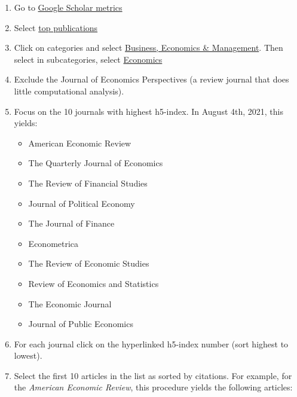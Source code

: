 \documentclass[
  openany]{book}
\providecommand{\tightlist}{%
  \setlength{\itemsep}{0pt}\setlength{\parskip}{0pt}}
\begin{document}
\begin{enumerate}
\def\labelenumi{\arabic{enumi}.}
\tightlist
\item
  Go to \href{https://scholar.google.com/citations?view_op=metrics_intro\&hl=en}{Google Scholar metrics}\\
\item
  Select \href{https://scholar.google.com/citations?view_op=top_venues\&hl=en}{top publications}\\
\item
  Click on categories and select \href{https://scholar.google.com/citations?view_op=top_venues\&hl=en\&vq=bus}{Business, Economics \& Management}. Then select in subcategories, select \href{https://scholar.google.com/citations?view_op=top_venues\&hl=en\&vq=bus_economics}{Economics}\\
\item
  Exclude the Journal of Economics Perspectives (a review journal that does little computational analysis).\\
\item
  Focus on the 10 journals with highest h5-index. In August 4th, 2021, this yields:

  \begin{itemize}
  \tightlist
  \item
    American Economic Review
  \item
    The Quarterly Journal of Economics
  \item
    The Review of Financial Studies
  \item
    Journal of Political Economy
  \item
    The Journal of Finance
  \item
    Econometrica
  \item
    The Review of Economic Studies
  \item
    Review of Economics and Statistics
  \item
    The Economic Journal
  \item
    Journal of Public Economics\\
  \end{itemize}
\item
  For each journal click on the hyperlinked h5-index number (sort highest to lowest).
\item
  Select the first 10 articles in the list as sorted by citations. For example, for the \emph{American Economic Review}, this procedure yields the following articles:


\end{enumerate}
\end{document}
